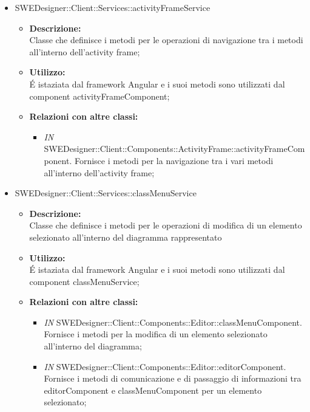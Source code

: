 \begin{itemize}
\begin{itemize}
		\item SWEDesigner::Client::Services::activityFrameService
		\begin{itemize}
			\item \textbf{Descrizione:}\\
			Classe che definisce i metodi per le operazioni di navigazione tra i metodi all'interno dell'activity frame;
			\item \textbf{Utilizzo:}\\
			É istaziata dal framework Angular e i suoi metodi sono utilizzati dal component activityFrameComponent;
			\item \textbf{Relazioni con altre classi: }
			\begin{itemize}
			\item \emph{IN}  SWEDesigner::Client::Components::ActivityFrame::activityFrameComponent. Fornisce i metodi per la navigazione tra i vari metodi all'interno dell'activity frame;
			\end{itemize}
		\end{itemize}
		
		\item SWEDesigner::Client::Services::classMenuService
		\begin{itemize}
			\item \textbf{Descrizione:}\\
			Classe che definisce i metodi per le operazioni di modifica di un elemento selezionato all'interno del diagramma rappresentato
			\item \textbf{Utilizzo:}\\
			É istaziata dal framework Angular e i suoi metodi sono utilizzati dal component classMenuService;
			\item \textbf{Relazioni con altre classi: }
			\begin{itemize}
			\item \emph{IN}  SWEDesigner::Client::Components::Editor::classMenuComponent. Fornisce i metodi per la modifica di un elemento selezionato all'interno del diagramma;
			\item \emph{IN}  SWEDesigner::Client::Components::Editor::editorComponent. Fornisce i metodi di comunicazione e di passaggio di informazioni tra editorComponent e classMenuComponent per un elemento selezionato;
			\end{itemize}
		\end{itemize}
		

\end{itemize}
\end{itemize}
